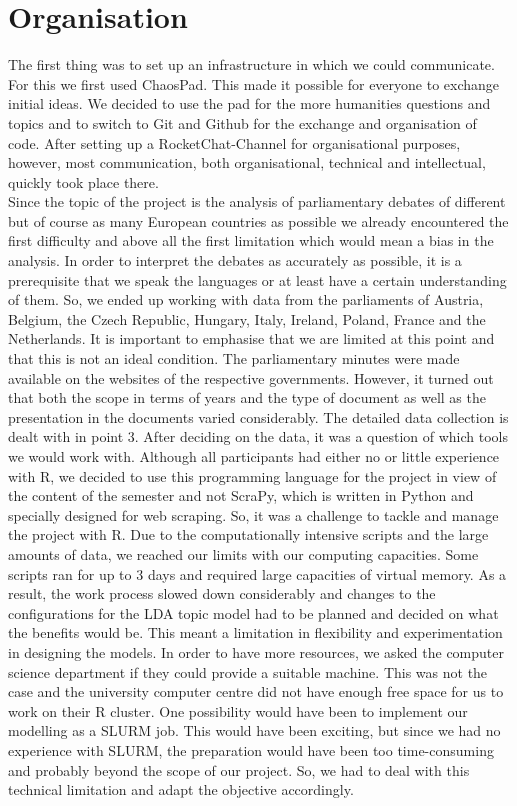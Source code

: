 \documentclass[
  12pt,
]{scrreprt}
\begin{document}
\hypertarget{organisation}{%
\chapter{Organisation}\label{organisation}}

The first thing was to set up an infrastructure in which we could
communicate. For this we first used ChaosPad. This made it possible for
everyone to exchange initial ideas. We decided to use the pad for the
more humanities questions and topics and to switch to Git and Github for
the exchange and organisation of code. After setting up a
RocketChat-Channel for organisational purposes, however, most
communication, both organisational, technical and intellectual, quickly
took place there.\\
Since the topic of the project is the analysis of parliamentary debates
of different but of course as many European countries as possible we
already encountered the first difficulty and above all the first
limitation which would mean a bias in the analysis. In order to
interpret the debates as accurately as possible, it is a prerequisite
that we speak the languages or at least have a certain understanding of
them. So, we ended up working with data from the parliaments of Austria,
Belgium, the Czech Republic, Hungary, Italy, Ireland, Poland, France and
the Netherlands. It is important to emphasise that we are limited at
this point and that this is not an ideal condition. The parliamentary
minutes were made available on the websites of the respective
governments. However, it turned out that both the scope in terms of
years and the type of document as well as the presentation in the
documents varied considerably. The detailed data collection is dealt
with in point 3. After deciding on the data, it was a question of which
tools we would work with. Although all participants had either no or
little experience with R, we decided to use this programming language
for the project in view of the content of the semester and not ScraPy,
which is written in Python and specially designed for web scraping. So,
it was a challenge to tackle and manage the project with R. Due to the
computationally intensive scripts and the large amounts of data, we
reached our limits with our computing capacities. Some scripts ran for
up to 3 days and required large capacities of virtual memory. As a
result, the work process slowed down considerably and changes to the
configurations for the LDA topic model had to be planned and decided on
what the benefits would be. This meant a limitation in flexibility and
experimentation in designing the models. In order to have more
resources, we asked the computer science department if they could
provide a suitable machine. This was not the case and the university
computer centre did not have enough free space for us to work on their R
cluster. One possibility would have been to implement our modelling as a
SLURM job. This would have been exciting, but since we had no experience
with SLURM, the preparation would have been too time-consuming and
probably beyond the scope of our project. So, we had to deal with this
technical limitation and adapt the objective accordingly.
\end{document}
